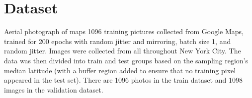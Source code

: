 \section{Dataset}


Aerial photograph of maps 1096 training pictures collected from Google Maps, trained for 200 epochs with random jitter and mirroring, batch size 1, and random jitter. Images were collected from all throughout New York City. The data was then divided into train and test groups based on the sampling region's median latitude (with a buffer region added to ensure that no training pixel appeared in the test set). There are 1096 photos in the train dataset and 1098 images in the validation dataset.



